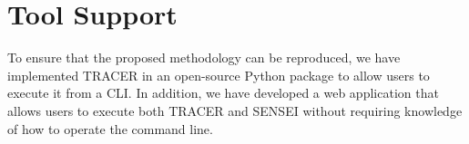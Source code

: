 
\chapter{Tool Support}\label{chapter:tool_support}

To ensure that the proposed methodology can be reproduced,
we have implemented \acf{TRACER} in an open-source Python package
to allow users to execute it from a \ac{CLI}.
In addition, we have developed a web application
that allows users to execute both \ac{TRACER} and SENSEI
without requiring knowledge of how to operate the command line.










